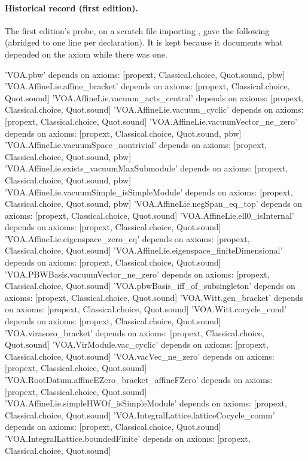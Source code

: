 \paragraph{Historical record (first edition).} The first edition's probe, on a
scratch file importing , gave the following (abridged to one line per declaration). It is kept
because it documents what depended on the axiom while there was one.
\begin{plaincode}
'VOA.pbw' depends on axioms: [propext, Classical.choice, Quot.sound, pbw]
'VOA.AffineLie.affine_bracket' depends on axioms: [propext, Classical.choice, Quot.sound]
'VOA.AffineLie.vacuum_acts_central' depends on axioms: [propext, Classical.choice, Quot.sound]
'VOA.AffineLie.vacuum_cyclic' depends on axioms: [propext, Classical.choice, Quot.sound]
'VOA.AffineLie.vacuumVector_ne_zero' depends on axioms: [propext, Classical.choice, Quot.sound, pbw]
'VOA.AffineLie.vacuumSpace_nontrivial' depends on axioms: [propext, Classical.choice, Quot.sound, pbw]
'VOA.AffineLie.exists_vacuumMaxSubmodule' depends on axioms: [propext, Classical.choice, Quot.sound, pbw]
'VOA.AffineLie.vacuumSimple_isSimpleModule' depends on axioms: [propext, Classical.choice, Quot.sound, pbw]
'VOA.AffineLie.negSpan_eq_top' depends on axioms: [propext, Classical.choice, Quot.sound]
'VOA.AffineLie.ell0_isInternal' depends on axioms: [propext, Classical.choice, Quot.sound]
'VOA.AffineLie.eigenspace_zero_eq' depends on axioms: [propext, Classical.choice, Quot.sound]
'VOA.AffineLie.eigenspace_finiteDimensional' depends on axioms: [propext, Classical.choice, Quot.sound]
'VOA.PBWBasis.vacuumVector_ne_zero' depends on axioms: [propext, Classical.choice, Quot.sound]
'VOA.pbwBasis_iff_of_subsingleton' depends on axioms: [propext, Classical.choice, Quot.sound]
'VOA.Witt.gen_bracket' depends on axioms: [propext, Classical.choice, Quot.sound]
'VOA.Witt.cocycle_cond' depends on axioms: [propext, Classical.choice, Quot.sound]
'VOA.virasoro_bracket' depends on axioms: [propext, Classical.choice, Quot.sound]
'VOA.VirModule.vac_cyclic' depends on axioms: [propext, Classical.choice, Quot.sound]
'VOA.vacVec_ne_zero' depends on axioms: [propext, Classical.choice, Quot.sound]
'VOA.RootDatum.affineEZero_bracket_affineFZero' depends on axioms: [propext, Classical.choice, Quot.sound]
'VOA.AffineLie.simpleHWOf_isSimpleModule' depends on axioms: [propext, Classical.choice, Quot.sound]
'VOA.IntegralLattice.latticeCocycle_comm' depends on axioms: [propext, Classical.choice, Quot.sound]
'VOA.IntegralLattice.boundedFinite' depends on axioms: [propext, Classical.choice, Quot.sound]

\end{plaincode}
